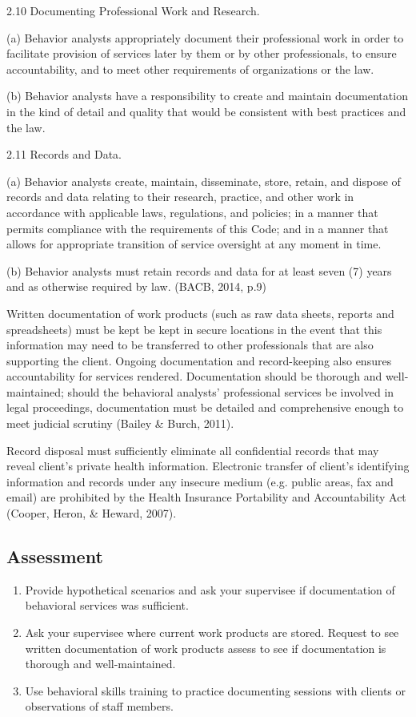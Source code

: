 2.10 Documenting Professional Work and Research.

(a) Behavior analysts appropriately document their professional work in order to facilitate provision of services later by them or by other professionals, to ensure accountability, and to meet other requirements of organizations or the law. 

(b) Behavior analysts have a responsibility to create and maintain documentation in the kind of detail and quality that would be consistent with best practices and the law. 

2.11 Records and Data. 

(a) Behavior analysts create, maintain, disseminate, store, retain, and dispose of records and data relating to their research, practice, and other work in accordance with applicable laws, regulations, and policies; in a manner that permits compliance with the requirements of this Code; and in a manner that allows for appropriate transition of service oversight at any moment in time. 

(b) Behavior analysts must retain records and data for at least seven (7) years and as otherwise required by law. (BACB, 2014, p.9)

Written documentation of work products (such as raw data sheets, reports and spreadsheets) must be kept be kept in secure locations in the event that this information may need to be transferred to other professionals that are also supporting the client. Ongoing documentation and record-keeping also ensures accountability for services rendered. Documentation should be thorough and well-maintained; should the behavioral analysts' professional services be involved in legal proceedings, documentation must be detailed and comprehensive enough to meet judicial scrutiny (Bailey \& Burch, 2011).

Record disposal must sufficiently eliminate all confidential records that may reveal client's private health information. Electronic transfer of client's identifying information and records under any insecure medium (e.g. public areas, fax and email) are prohibited by the Health Insurance Portability and Accountability Act (Cooper, Heron, \& Heward, 2007). 
%
\subsection{Assessment}
\begin{enumerate}
\item Provide hypothetical scenarios and ask your supervisee if documentation of behavioral services was sufficient.
\item Ask your supervisee where current work products are stored. Request to see written documentation of work products assess to see if documentation is thorough and well-maintained. 
\item Use behavioral skills training to practice documenting sessions with clients or observations of staff members.
%
\end{enumerate}
%

